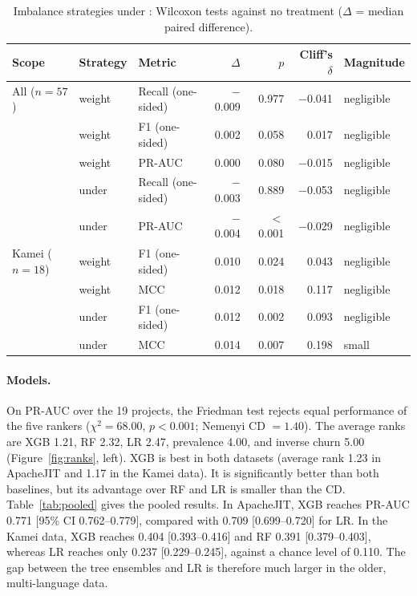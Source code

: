\begin{table}[t]
\centering
\caption{Imbalance strategies under \pthree{}: Wilcoxon tests against no treatment ($\Delta$ = median paired difference).}
\label{tab:imb}
\small
\begin{tabular}{lllrrrl}
\toprule
Scope & Strategy & Metric & $\Delta$ & $p$ & Cliff's $\delta$ & Magnitude \\
\midrule
All ($n=57$) & weight & Recall (one-sided) & $-$0.009 & 0.977 & $-$0.041 & negligible \\
             & weight & F1 (one-sided)     & 0.002 & 0.058 & 0.017 & negligible \\
             & weight & PR-AUC             & 0.000 & 0.080 & $-$0.015 & negligible \\
             & under  & Recall (one-sided) & $-$0.003 & 0.889 & $-$0.053 & negligible \\
             & under  & PR-AUC             & $-$0.004 & $<$0.001 & $-$0.029 & negligible \\
\midrule
Kamei ($n=18$) & weight & F1 (one-sided) & 0.010 & 0.024 & 0.043 & negligible \\
               & weight & MCC            & 0.012 & 0.018 & 0.117 & negligible \\
               & under  & F1 (one-sided) & 0.012 & 0.002 & 0.093 & negligible \\
               & under  & MCC            & 0.014 & 0.007 & 0.198 & small \\
\bottomrule
\end{tabular}
\end{table}

\paragraph{Models.} On PR-AUC over the 19 projects, the Friedman test rejects equal performance of the five rankers ($\chi^2=68.00$, $p<0.001$; Nemenyi CD $=1.40$). The average ranks are XGB 1.21, RF 2.32, LR 2.47, prevalence 4.00, and inverse churn 5.00 (Figure~\ref{fig:ranks}, left). XGB is best in both datasets (average rank 1.23 in ApacheJIT and 1.17 in the Kamei data). It is significantly better than both baselines, but its advantage over RF and LR is smaller than the CD. Table~\ref{tab:pooled} gives the pooled results. In ApacheJIT, XGB reaches PR-AUC 0.771 [95\% CI 0.762--0.779], compared with 0.709 [0.699--0.720] for LR. In the Kamei data, XGB reaches 0.404 [0.393--0.416] and RF 0.391 [0.379--0.403], whereas LR reaches only 0.237 [0.229--0.245], against a chance level of 0.110. The gap between the tree ensembles and LR is therefore much larger in the older, multi-language data.

